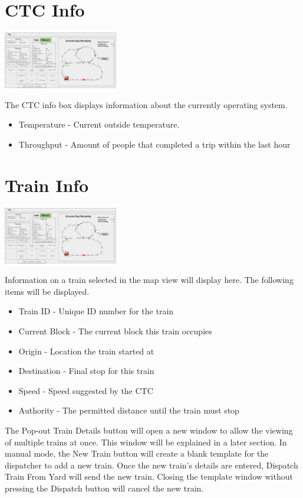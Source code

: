 \documentclass{scrreprt}
\begin{document}
\section{CTC Info}
\begin{center}
  \includegraphics[trim={.45cm 13.5cm 27.45cm 1.7cm},clip,width=5cm]{CTC-main}
\end{center}
The CTC info box displays information about the currently operating system.
\begin{itemize}
  \item Temperature - Current outside temperature.
  \item Throughput - Amount of people that completed a trip within the last hour
\end{itemize}

\section{Train Info}
\begin{center}
  \includegraphics[trim={.45cm 6.6cm 27.45cm 4.6cm},clip,width=5cm]{CTC-main}
\end{center}
Information on a train selected in the map view will display here. The following items
will be displayed.
\begin{itemize}
  \item Train ID - Unique ID number for the train
  \item Current Block - The current block this train occupies
  \item Origin - Location the train started at
  \item Destination - Final stop for this train
  \item Speed - Speed suggested by the CTC
  \item Authority - The permitted distance until the train must stop
\end{itemize}
The Pop-out Train Details button will open a new window to allow the viewing of multiple
trains at once. This window will be explained in a later section. In manual mode, the New
Train button will create a blank template for the dispatcher to add a new train. Once the
new train's details are entered, Dispatch Train From Yard will send the new train. Closing
the template window without pressing the Dispatch button will cancel the new train.
\end{document}
